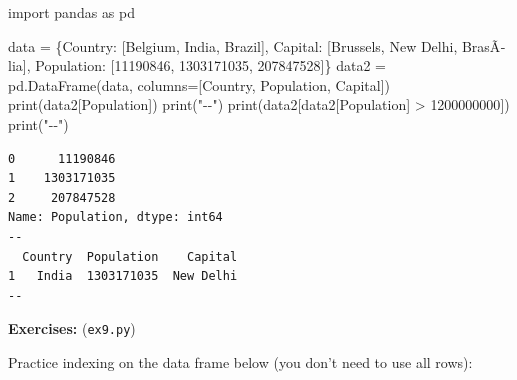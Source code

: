 \documentclass[
  english,
  letterpaper,
  DIV=11,
  numbers=noendperiod]{scrreprt}
\newenvironment{Shaded}{\begin{snugshade}}{\end{snugshade}}
\newcommand{\BuiltInTok}[1]{\textcolor[rgb]{0.00,0.23,0.31}{#1}}
\newcommand{\DecValTok}[1]{\textcolor[rgb]{0.68,0.00,0.00}{#1}}
\newcommand{\ImportTok}[1]{\textcolor[rgb]{0.00,0.46,0.62}{#1}}
\newcommand{\NormalTok}[1]{\textcolor[rgb]{0.00,0.23,0.31}{#1}}
\newcommand{\OperatorTok}[1]{\textcolor[rgb]{0.37,0.37,0.37}{#1}}
\newcommand{\StringTok}[1]{\textcolor[rgb]{0.13,0.47,0.30}{#1}}
\begin{document}
\begin{Shaded}
\begin{Highlighting}[]
\ImportTok{import}\NormalTok{ pandas }\ImportTok{as}\NormalTok{ pd}

\NormalTok{data }\OperatorTok{=}\NormalTok{ \{}\StringTok{\textquotesingle{}Country\textquotesingle{}}\NormalTok{: [}\StringTok{\textquotesingle{}Belgium\textquotesingle{}}\NormalTok{, }\StringTok{\textquotesingle{}India\textquotesingle{}}\NormalTok{, }\StringTok{\textquotesingle{}Brazil\textquotesingle{}}\NormalTok{],}
        \StringTok{\textquotesingle{}Capital\textquotesingle{}}\NormalTok{: [}\StringTok{\textquotesingle{}Brussels\textquotesingle{}}\NormalTok{, }\StringTok{\textquotesingle{}New Delhi\textquotesingle{}}\NormalTok{, }\StringTok{\textquotesingle{}BrasÃ­lia\textquotesingle{}}\NormalTok{],}
        \StringTok{\textquotesingle{}Population\textquotesingle{}}\NormalTok{: [}\DecValTok{11190846}\NormalTok{, }\DecValTok{1303171035}\NormalTok{, }\DecValTok{207847528}\NormalTok{]\}}
\NormalTok{data2 }\OperatorTok{=}\NormalTok{ pd.DataFrame(data, columns}\OperatorTok{=}\NormalTok{[}\StringTok{\textquotesingle{}Country\textquotesingle{}}\NormalTok{, }\StringTok{\textquotesingle{}Population\textquotesingle{}}\NormalTok{, }\StringTok{\textquotesingle{}Capital\textquotesingle{}}\NormalTok{])}
\BuiltInTok{print}\NormalTok{(data2[}\StringTok{\textquotesingle{}Population\textquotesingle{}}\NormalTok{])}
\BuiltInTok{print}\NormalTok{(}\StringTok{"{-}{-}"}\NormalTok{)}
\BuiltInTok{print}\NormalTok{(data2[data2[}\StringTok{\textquotesingle{}Population\textquotesingle{}}\NormalTok{] }\OperatorTok{\textgreater{}} \DecValTok{1200000000}\NormalTok{])}
\BuiltInTok{print}\NormalTok{(}\StringTok{"{-}{-}"}\NormalTok{)}
\end{Highlighting}
\end{Shaded}

\begin{verbatim}
0      11190846
1    1303171035
2     207847528
Name: Population, dtype: int64
--
  Country  Population    Capital
1   India  1303171035  New Delhi
--
\end{verbatim}

\textbf{Exercises:} (\texttt{ex9.py})

Practice indexing on the data frame below (you don't need to use all
rows):
\end{document}
